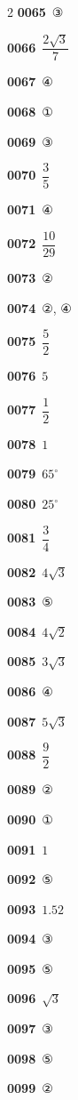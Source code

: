 \documentclass[10pt,a4paper]{article}
\begin{document}
\begin{multicols}{2}
\noindent\textbf{0065}\ ③\par
\noindent\textbf{0066}\ $\dfrac{2\sqrt{3}}{7}$\par
\noindent\textbf{0067}\ ④\par
\noindent\textbf{0068}\ ①\par
\noindent\textbf{0069}\ ③\par
\noindent\textbf{0070}\ $\dfrac{3}{5}$\par
\noindent\textbf{0071}\ ④\par
\noindent\textbf{0072}\ $\dfrac{10}{29}$\par
\noindent\textbf{0073}\ ②\par
\noindent\textbf{0074}\ ②, ④\par
\noindent\textbf{0075}\ $\dfrac{5}{2}$\par
\noindent\textbf{0076}\ $5$\par
\noindent\textbf{0077}\ $\dfrac{1}{2}$\par
\noindent\textbf{0078}\ $1$\par
\noindent\textbf{0079}\ $65^\circ$\par
\noindent\textbf{0080}\ $25^\circ$\par
\noindent\textbf{0081}\ $\dfrac{3}{4}$\par
\noindent\textbf{0082}\ $4\sqrt{3}$\par
\noindent\textbf{0083}\ ⑤\par
\noindent\textbf{0084}\ $4\sqrt{2}$\par
\noindent\textbf{0085}\ $3\sqrt{3}$\par
\noindent\textbf{0086}\ ④\par
\noindent\textbf{0087}\ $5\sqrt{3}$\par
\noindent\textbf{0088}\ $\dfrac{9}{2}$\par
\noindent\textbf{0089}\ ②\par
\noindent\textbf{0090}\ ①\par
\noindent\textbf{0091}\ $1$\par
\noindent\textbf{0092}\ ⑤\par
\noindent\textbf{0093}\ $1.52$\par
\noindent\textbf{0094}\ ③\par
\noindent\textbf{0095}\ ⑤\par
\noindent\textbf{0096}\ $\sqrt{3}$\par
\noindent\textbf{0097}\ ③\par
\noindent\textbf{0098}\ ⑤\par
\noindent\textbf{0099}\ ②\par

\end{multicols}
\end{document}
